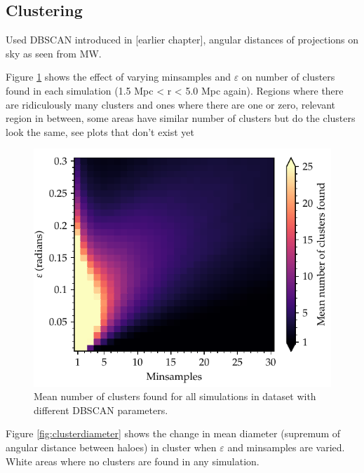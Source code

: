 \documentclass[english, oneside]{HYgradu}
\begin{document}
\subsection{Clustering}
Used DBSCAN introduced in [earlier chapter], angular distances of projections on sky as seen from MW.

Figure \ref{fig:clusteringparameters} shows the effect of varying minsamples and $\varepsilon$ on number of clusters found in each simulation (1.5 Mpc < r < 5.0 Mpc again). Regions where there are ridiculously many clusters and ones where there are one or zero, relevant region in between, some areas have similar number of clusters but do the clusters look the same, see plots that don't exist yet

\begin{figure}
    \centering
    \includegraphics{kuvat/clusteringParameters.pdf}
    \caption{Mean number of clusters found for all simulations in dataset with different DBSCAN parameters.}\label{fig:clusteringparameters}
\end{figure}

Figure \ref{fig:clusterdiameter} shows the change in mean diameter (supremum of angular distance between haloes) in cluster when $\varepsilon$ and minsamples are varied. White areas where no clusters are found in any simulation.
\end{document}
